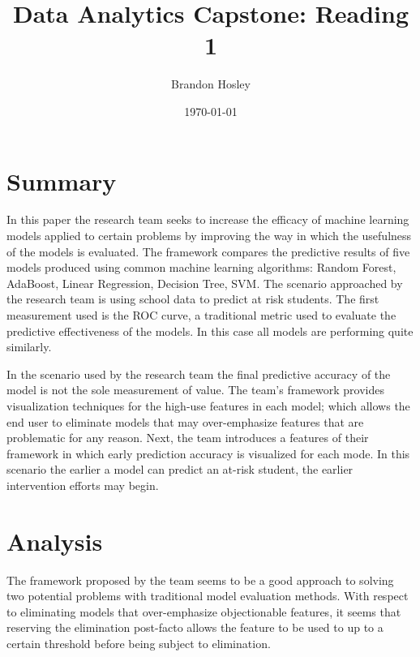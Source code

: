 \documentclass[]{article}
\title{Data Analytics Capstone: Reading 1}
\author{Brandon Hosley}
\date{\today}
\begin{document}
	\maketitle
	
\section{Summary} 

In this paper \cite{Lakkaraju2015} the research team seeks to increase the efficacy of machine learning models applied to certain problems by improving the way in which the usefulness of the models is evaluated. 
The framework compares the predictive results of five models produced using common machine learning algorithms: Random Forest, AdaBoost, Linear Regression, Decision Tree, SVM.
The scenario approached by the research team is using school data to predict at risk students.
The first measurement used is the ROC curve, a traditional metric used to evaluate the predictive effectiveness of the models.
In this case all models are performing quite similarly.

In the scenario used by the research team the final predictive accuracy of the model is not the sole measurement of value.
The team's framework provides visualization techniques for the high-use features in each model;
which allows the end user to eliminate models that may over-emphasize features that are problematic for any reason.
Next, the team introduces a features of their framework in which early prediction accuracy is visualized for each mode.
In this scenario the earlier a model can predict an at-risk student, the earlier intervention efforts may begin.

\section{Analysis}

The framework proposed by the team seems to be a good approach to solving two potential problems with traditional model evaluation methods.
With respect to eliminating models that over-emphasize objectionable features, it seems that reserving the elimination post-facto allows the feature to be used to up to a certain threshold before being subject to elimination.



\clearpage


\end{document}
